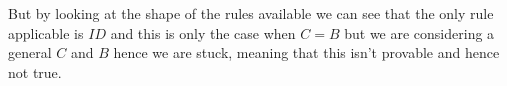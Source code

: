 \documentclass{article}
\begin{document}
But by looking at the shape of the rules available we can see that the only rule applicable is \(ID\) and this is only the case when \(C = B\) but we are considering a general \(C\) and \(B\) hence we are stuck, meaning that this isn't provable and hence not true.






\end{document}
